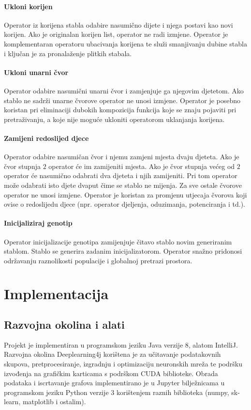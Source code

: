 \documentclass[times, utf8, numeric, diplomski]{fer}
\begin{document}
\subsubsection{Ukloni korijen}
Operator iz korijena stabla odabire nasumično dijete i njega postavi kao novi korijen. Ako je originalan korijen list, operator ne radi izmjene. Operator je komplementaran operatoru ubacivanja korijena te služi smanjivanju dubine stabla i ključan je za pronalaženje plitkih stabala.

\subsubsection{Ukloni unarni čvor}
Operator odabire nasumični unarni čvor i zamjenjuje ga njegovim djetetom. Ako stablo ne sadrži unarne čvorove operator ne unosi izmjene. Operator je posebno koristan pri eliminaciji dubokih kompozicija funkcija koje se znaju pojaviti pri pretraživanju, a koje nije moguće ukloniti operatorom uklanjanja korijena.

\subsubsection{Zamijeni redoslijed djece}
Operator odabire nasumičan čvor i njemu zamjeni mjesta dvaju djeteta. Ako je čvor stupnja $2$ operator će im zamijeniti mjesta. Ako je čvor stupnja većeg od $2$ operator će nasumično odabrati dva djeteta i njih zamijeniti. Pri tom operator može odabrati isto djete dvaput čime se stablo ne mijenja. Za sve ostale čvorove operator ne unosi izmjene. Operator je koristan za promjenu utjecaja čvorova koji ovise o redoslijedu djece (npr. operator djeljenja, oduzimanja, potenciranja i td.).

\subsubsection{Inicijaliziraj genotip}
Operator inicijalizacije genotipa zamijenjuje čitavo stablo novim generiranim stablom. Stablo se generira zadanim inicijalizatorom. Operator snažno pridonosi održavanju raznolikosti populacije i globalnoj pretrazi prostora.


\chapter{Implementacija}
\section{Razvojna okolina i alati}
Projekt je implementiran u programskom jeziku Java verzije 8, alatom IntelliJ. Razvojna okolina Deeplearning4j korištena je za učitavanje podatakovnih skupova, pretprocesiranje, izgradnju i optimizaciju neuronskih mreža te podršku izvođenja na grafičkim karticama s podrškom CUDA biblioteke. Obrada podataka i iscrtavanje grafova implementirano je u Jupyter bilježnicama u programskom jeziku Python verzije 3 korištenjem raznih biblioteka (numpy, sk-learn, matplotlib i ostalim).
\end{document}
